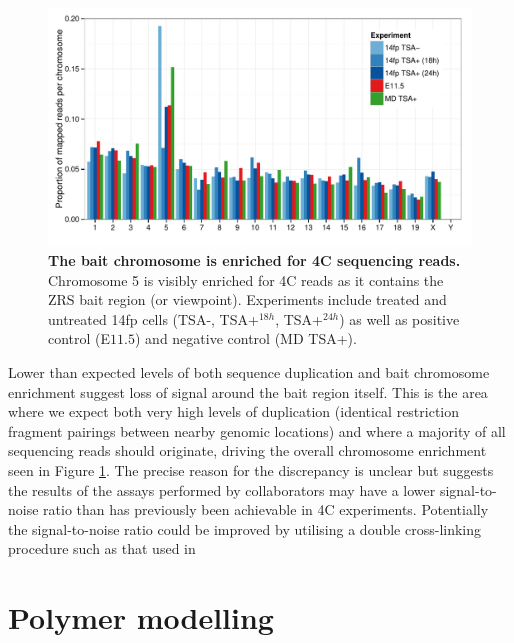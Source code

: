 \documentclass[a4paper,11pt,oneside]{book}
\begin{document}
\begin{figure}
\begin{center} 
\includegraphics[width=5.4in]{figs/4c_chromosomes_v2.pdf}
\captionsetup{width=\textwidth} 
\caption[ The bait chromosome is enriched for 4C sequencing reads. ]{ {\bf The bait chromosome is enriched for 4C sequencing reads. }
Chromosome 5 is visibly enriched for 4C reads as it  contains the ZRS bait region (or viewpoint). Experiments include treated and untreated 14fp cells (TSA-, TSA+$^{18h}$, TSA+$^{24h}$) as well as positive control (E$11.5$) and negative control (MD TSA+).
}\label{fig:4cchromosomes}
\end{center} 
\end{figure} 

Lower than expected levels of both sequence duplication and bait chromosome enrichment suggest loss of signal around the bait region itself. This is the area where we expect both very high levels of duplication (identical restriction fragment pairings between nearby genomic locations) and where a majority of all sequencing reads should originate, driving the overall chromosome enrichment seen in Figure \ref{fig:4cchromosomes}. The precise reason for the discrepancy is unclear but suggests the results of the assays performed by collaborators may have a lower signal-to-noise ratio than has previously been achievable in 4C experiments.\cite{Stadhouders2013} Potentially the signal-to-noise ratio could be improved by utilising a double cross-linking procedure such as that used in \citet{Lin2012}

\section{Polymer modelling}
\end{document}
